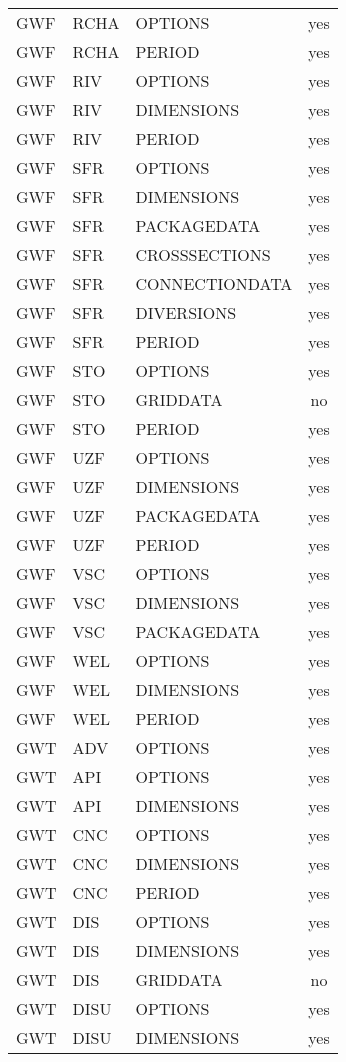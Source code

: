 \begin{longtable}{p{1.5cm} p{1.5cm} p{3cm} c}
\hline
GWF & RCHA & OPTIONS & yes \\ 
GWF & RCHA & PERIOD & yes \\ 
\hline
GWF & RIV & OPTIONS & yes \\ 
GWF & RIV & DIMENSIONS & yes \\ 
GWF & RIV & PERIOD & yes \\ 
\hline
GWF & SFR & OPTIONS & yes \\ 
GWF & SFR & DIMENSIONS & yes \\ 
GWF & SFR & PACKAGEDATA & yes \\ 
GWF & SFR & CROSSSECTIONS & yes \\ 
GWF & SFR & CONNECTIONDATA & yes \\ 
GWF & SFR & DIVERSIONS & yes \\ 
GWF & SFR & PERIOD & yes \\ 
\hline
GWF & STO & OPTIONS & yes \\ 
GWF & STO & GRIDDATA & no \\ 
GWF & STO & PERIOD & yes \\ 
\hline
GWF & UZF & OPTIONS & yes \\ 
GWF & UZF & DIMENSIONS & yes \\ 
GWF & UZF & PACKAGEDATA & yes \\ 
GWF & UZF & PERIOD & yes \\ 
\hline
GWF & VSC & OPTIONS & yes \\ 
GWF & VSC & DIMENSIONS & yes \\ 
GWF & VSC & PACKAGEDATA & yes \\ 
\hline
GWF & WEL & OPTIONS & yes \\ 
GWF & WEL & DIMENSIONS & yes \\ 
GWF & WEL & PERIOD & yes \\ 
\hline
GWT & ADV & OPTIONS & yes \\ 
\hline
GWT & API & OPTIONS & yes \\ 
GWT & API & DIMENSIONS & yes \\ 
\hline
GWT & CNC & OPTIONS & yes \\ 
GWT & CNC & DIMENSIONS & yes \\ 
GWT & CNC & PERIOD & yes \\ 
\hline
GWT & DIS & OPTIONS & yes \\ 
GWT & DIS & DIMENSIONS & yes \\ 
GWT & DIS & GRIDDATA & no \\ 
\hline
GWT & DISU & OPTIONS & yes \\ 
GWT & DISU & DIMENSIONS & yes \\ 

\end{longtable}

